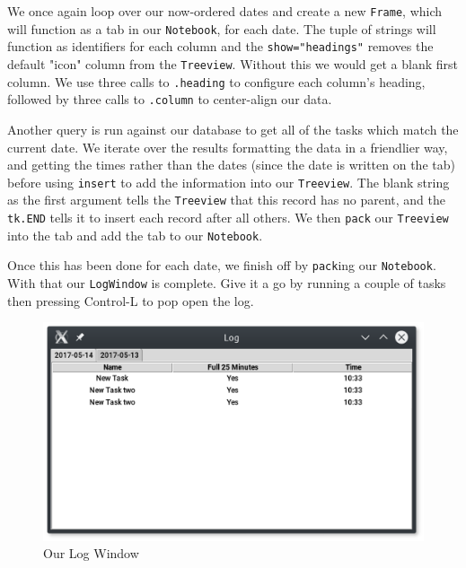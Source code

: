 \documentclass[a4paper,11pt,openany]{book}
\begin{document}
We once again loop over our now-ordered dates and create a new \lstinline[columns=fixed]{Frame}, which will function as a tab in our \lstinline[columns=fixed]{Notebook}, for each date. The tuple of strings will function as identifiers for each column and the \lstinline[columns=fixed]{show="headings"} removes the default "icon" column from the \lstinline[columns=fixed]{Treeview}. Without this we would get a blank first column. We use three calls to \lstinline[columns=fixed]{.heading} to configure each column's heading, followed by three calls to \lstinline[columns=fixed]{.column} to center-align our data. 

\vspace{5mm}

Another query is run against our database to get all of the tasks which match the current date. We iterate over the results formatting the data in a friendlier way, and getting the times rather than the dates (since the date is written on the tab) before using \lstinline[columns=fixed]{insert} to add the information into our \lstinline[columns=fixed]{Treeview}. The blank string as the first argument tells the \lstinline[columns=fixed]{Treeview} that this record has no parent, and the \lstinline[columns=fixed]{tk.END} tells it to insert each record after all others. We then \lstinline[columns=fixed]{pack} our \lstinline[columns=fixed]{Treeview} into the tab and add the tab to our \lstinline[columns=fixed]{Notebook}. 

\vspace{5mm}

Once this has been done for each date, we finish off by \lstinline[columns=fixed]{pack}ing our \lstinline[columns=fixed]{Notebook}. With that our \lstinline[columns=fixed]{LogWindow} is complete. Give it a go by running a couple of tasks then pressing Control-L to pop open the log. 

\begin{figure}[h]
\centering
\includegraphics{Ch7-2}
\caption{Our Log Window}
\end{figure}
\end{document}
